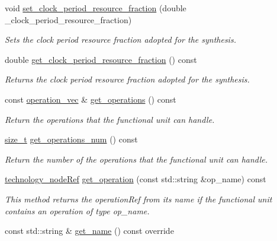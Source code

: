 \begin{DoxyCompactItemize}
void \hyperlink{structfunctional__unit_af2184fccfe63e8b0d8b9768d242f5558}{set\+\_\+clock\+\_\+period\+\_\+resource\+\_\+fraction} (double \+\_\+clock\+\_\+period\+\_\+resource\+\_\+fraction)
\begin{DoxyCompactList}\small\item\em Sets the clock period resource fraction adopted for the synthesis. \end{DoxyCompactList}\item 
double \hyperlink{structfunctional__unit_af725411ddb7e1a3a512eabe3876bccf5}{get\+\_\+clock\+\_\+period\+\_\+resource\+\_\+fraction} () const
\begin{DoxyCompactList}\small\item\em Returns the clock period resource fraction adopted for the synthesis. \end{DoxyCompactList}\item 
const \hyperlink{structfunctional__unit_a95afca234ddcc2e13d56d6e5eb53557a}{operation\+\_\+vec} \& \hyperlink{structfunctional__unit_acf734bdfd3d41b4ce83ea6553b6ba051}{get\+\_\+operations} () const
\begin{DoxyCompactList}\small\item\em Return the operations that the functional unit can handle. \end{DoxyCompactList}\item 
\hyperlink{tutorial__fpt__2017_2intro_2sixth_2test_8c_a7c94ea6f8948649f8d181ae55911eeaf}{size\+\_\+t} \hyperlink{structfunctional__unit_a39929de3fd82d1665539576d738dfff0}{get\+\_\+operations\+\_\+num} () const
\begin{DoxyCompactList}\small\item\em Return the number of the operations that the functional unit can handle. \end{DoxyCompactList}\item 
\hyperlink{technology__node_8hpp_a33dd193b7bd6b987bf0d8a770a819fa7}{technology\+\_\+node\+Ref} \hyperlink{structfunctional__unit_a4e2dee20e6116b84d95e97b9ccbb3e7d}{get\+\_\+operation} (const std\+::string \&op\+\_\+name) const
\begin{DoxyCompactList}\small\item\em This method returns the operation\+Ref from its name if the functional unit contains an operation of type op\+\_\+name. \end{DoxyCompactList}\item 
const std\+::string \& \hyperlink{structfunctional__unit_a9761616dcfc8f37c93431d4260127ceb}{get\+\_\+name} () const override

\end{DoxyCompactItemize}
